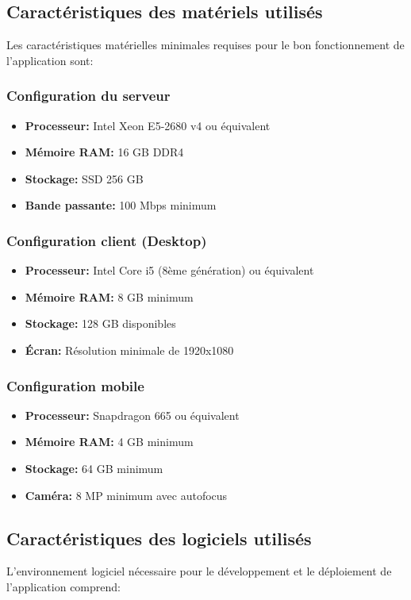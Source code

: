 \subsection{Caractéristiques des matériels utilisés}
Les caractéristiques matérielles minimales requises pour le bon fonctionnement de l'application sont:

\subsubsection{Configuration du serveur}
\begin{itemize}
    \item \textbf{Processeur:} Intel Xeon E5-2680 v4 ou équivalent
    \item \textbf{Mémoire RAM:} 16 GB DDR4
    \item \textbf{Stockage:} SSD 256 GB
    \item \textbf{Bande passante:} 100 Mbps minimum
\end{itemize}

\subsubsection{Configuration client (Desktop)}
\begin{itemize}
    \item \textbf{Processeur:} Intel Core i5 (8ème génération) ou équivalent
    \item \textbf{Mémoire RAM:} 8 GB minimum
    \item \textbf{Stockage:} 128 GB disponibles
    \item \textbf{Écran:} Résolution minimale de 1920x1080
\end{itemize}

\subsubsection{Configuration mobile}
\begin{itemize}
    \item \textbf{Processeur:} Snapdragon 665 ou équivalent
    \item \textbf{Mémoire RAM:} 4 GB minimum
    \item \textbf{Stockage:} 64 GB minimum
    \item \textbf{Caméra:} 8 MP minimum avec autofocus
\end{itemize}

\subsection{Caractéristiques des logiciels utilisés}
L'environnement logiciel nécessaire pour le développement et le déploiement de l'application comprend:

